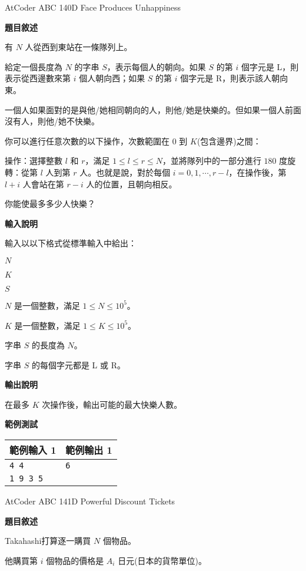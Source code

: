     \problem AtCoder ABC 140D Face Produces Unhappiness

    \textbf{題目敘述}

    有 $N$ 人從西到東站在一條隊列上。

    給定一個長度為 $N$ 的字串 $S$，表示每個人的朝向。如果 $S$ 的第 $i$ 個字元是 L，則表示從西邊數來第 $i$ 個人朝向西；如果 $S$ 的第 $i$ 個字元是 R，則表示該人朝向東。
    
    一個人如果面對的是與他/她相同朝向的人，則他/她是快樂的。但如果一個人前面沒有人，則他/她不快樂。
    
    你可以進行任意次數的以下操作，次數範圍在 $0$ 到 $K$(包含邊界)之間：
    
    操作：選擇整數 $l$ 和 $r$，滿足 $1\le l\le r\le N$，並將隊列中的一部分進行 $180$ 度旋轉：從第 $l$ 人到第 $r$ 人。也就是說，對於每個 $i=0,1,\cdots,r-l$，在操作後，第 $l+i$ 人會站在第 $r-i$ 人的位置，且朝向相反。
    
    你能使最多多少人快樂？

    \textbf{輸入說明}

    輸入以以下格式從標準輸入中給出：
    
    $N$

    $K$

    $S$    

    $N$ 是一個整數，滿足 $1\le N \le 10^5$。

    $K$ 是一個整數，滿足 $1\le K \le 10^5$。

    字串 $S$ 的長度為 $N$。

    字串 $S$ 的每個字元都是 L 或 R。

    \textbf{輸出說明}

    在最多 $K$ 次操作後，輸出可能的最大快樂人數。

    \textbf{範例測試}

    \begin{tabular}{|m{7cm}|m{7cm}|}
        \hline
        範例輸入 1 & 範例輸出 1 \\
        \hline
        \verb|4 4| & \verb|6| \\
        \verb|1 9 3 5| & \\
        \hline
    \end{tabular}

    \problem AtCoder ABC 141D Powerful Discount Tickets

    \textbf{題目敘述}

    Takahashi打算逐一購買 $N$ 個物品。

    他購買第 $i$ 個物品的價格是 $A_i$ 日元(日本的貨幣單位)。
    

